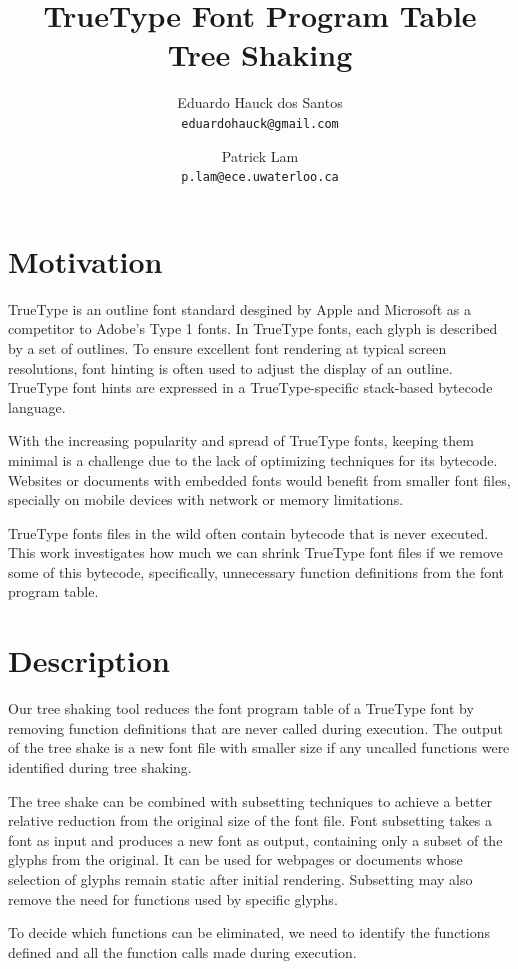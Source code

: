 \documentclass[12pt]{article}
\title{TrueType Font Program Table Tree Shaking}
\author{
  Eduardo Hauck dos Santos\\
  \texttt{eduardohauck@gmail.com}
  \and
  Patrick Lam\\
  \texttt{p.lam@ece.uwaterloo.ca}
}
\begin{document}
\maketitle

\section{Motivation}
TrueType is an outline font standard desgined by Apple and Microsoft as
a competitor to Adobe's Type 1 fonts. In TrueType fonts, each glyph is
described by a set of outlines. To ensure excellent font rendering at typical
screen resolutions, font hinting is often used to adjust the display of
an outline. TrueType font hints are expressed in a TrueType-specific
stack-based bytecode language.

With the increasing popularity and spread of TrueType fonts, keeping
them  minimal is a challenge due to the lack of optimizing techniques
for its bytecode. Websites or documents with embedded fonts would benefit
from smaller font files, specially on mobile devices with network or
memory limitations.

TrueType fonts files in the wild often contain bytecode that is never
executed. This work investigates how much we can shrink TrueType font
files if we remove some of this bytecode, specifically, unnecessary
function definitions from the font program table.

\section{Description}

Our tree shaking tool reduces the font program table of a
TrueType font by removing function definitions that are never called
during execution. The output of the tree shake is a new font file with
smaller size if any uncalled functions were identified during tree shaking.

The tree shake can be combined with subsetting techniques to achieve a
better relative reduction from the original size of the font file. Font
subsetting takes a font as input and produces a new font as output,
containing only a subset of the glyphs from the original. It can be used
for webpages or documents whose selection of glyphs remain static after
initial rendering. Subsetting may also remove the need for functions
used by specific glyphs.

To decide which functions can be eliminated, we need to identify the
functions defined and all the function calls made during execution.
\end{document}
